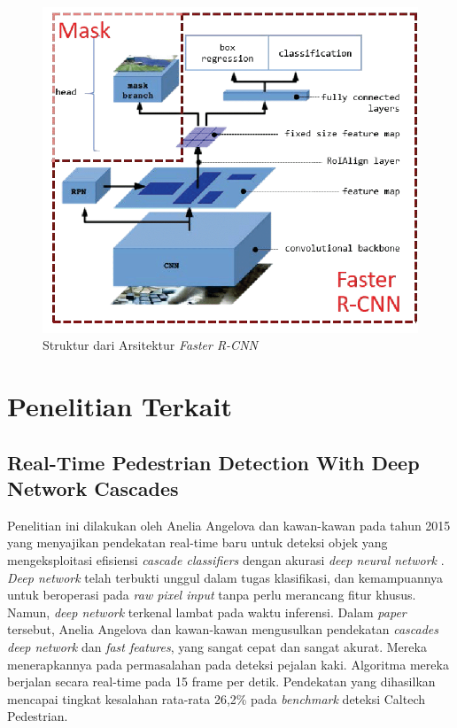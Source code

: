 \begin{figure}[h]
	\centering
	\includegraphics[scale=0.25]{gambar/arch-mask-rcnn.png}
	\caption{Struktur dari Arsitektur \textit{Faster R-CNN} \citep{arch-mask-rcnn}}
	\label{fig:mask-rcnn}
\end{figure}

\section{Penelitian Terkait}
\label{penelitianterkait}

\subsection{Real-Time Pedestrian Detection With Deep Network Cascades}
\label{realtime-pedestrian}

Penelitian ini dilakukan oleh Anelia Angelova dan kawan-kawan pada tahun 2015 yang menyajikan pendekatan real-time baru untuk deteksi objek yang mengeksploitasi efisiensi \textit{cascade classifiers} dengan akurasi \textit{deep neural network} \citep{penelitianterkait1}. \textit{Deep network} telah terbukti unggul dalam tugas klasifikasi, dan kemampuannya untuk beroperasi pada \textit{raw pixel input} tanpa perlu merancang fitur khusus. Namun, \textit{deep network} terkenal lambat pada waktu inferensi. Dalam \textit{paper} tersebut, Anelia Angelova dan kawan-kawan mengusulkan pendekatan \textit{cascades deep network} dan \textit{fast features}, yang sangat cepat dan sangat akurat. Mereka menerapkannya pada permasalahan pada deteksi pejalan kaki. Algoritma mereka berjalan secara real-time pada 15 frame per detik. Pendekatan yang dihasilkan mencapai tingkat kesalahan rata-rata 26,2\% pada \textit{benchmark} deteksi Caltech Pedestrian.

